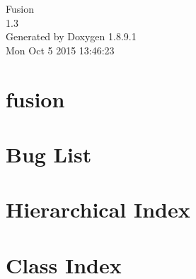 \documentclass[twoside]{book}
\newcommand{\+}{\discretionary{\mbox{\scriptsize$\hookleftarrow$}}{}{}}
\newcommand{\clearemptydoublepage}{%
  \newpage{\pagestyle{empty}\cleardoublepage}%
}
\begin{document}
\hypersetup{pageanchor=false,
             bookmarks=true,
             bookmarksnumbered=true,
             pdfencoding=unicode
            }
\begin{titlepage}
\vspace*{7cm}
\begin{center}%
{\Large Fusion \\[1ex]\large 1.\+3 }\\
\vspace*{1cm}
{\large Generated by Doxygen 1.8.9.1}\\
\vspace*{0.5cm}
{\small Mon Oct 5 2015 13:46:23}\\
\end{center}
\end{titlepage}
\clearemptydoublepage
\tableofcontents
\clearemptydoublepage
{}
\hypersetup{pageanchor=true}

\chapter{fusion}
\label{md__d_1__qt_program__qt5__fusion__r_e_a_d_m_e}
\hypertarget{md__d_1__qt_program__qt5__fusion__r_e_a_d_m_e}{}

\chapter{Bug List}
\label{bug}
\hypertarget{bug}{}

\chapter{Hierarchical Index}

\chapter{Class Index}

\end{document}
